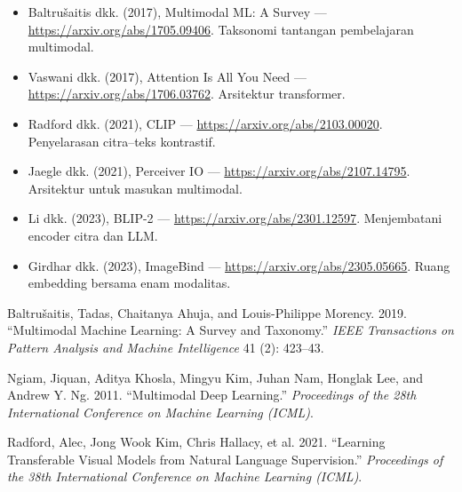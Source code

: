 \begin{bacaan}

\begin{itemize}
\tightlist
\item
  Baltrušaitis dkk. (2017), Multimodal ML: A Survey --- \url{https://arxiv.org/abs/1705.09406}. Taksonomi tantangan pembelajaran multimodal.
\item
  Vaswani dkk. (2017), Attention Is All You Need --- \url{https://arxiv.org/abs/1706.03762}. Arsitektur transformer.
\item
  Radford dkk. (2021), CLIP --- \url{https://arxiv.org/abs/2103.00020}. Penyelarasan citra--teks kontrastif.
\item
  Jaegle dkk. (2021), Perceiver IO --- \url{https://arxiv.org/abs/2107.14795}. Arsitektur untuk masukan multimodal.
\item
  Li dkk. (2023), BLIP-2 --- \url{https://arxiv.org/abs/2301.12597}. Menjembatani encoder citra dan LLM.
\item
  Girdhar dkk. (2023), ImageBind --- \url{https://arxiv.org/abs/2305.05665}. Ruang embedding bersama enam modalitas.
\end{itemize}

\end{bacaan}

\rujukanheading

\protect{}\label{refs}
\begin{CSLReferences}{1}{1}
Baltrušaitis, Tadas, Chaitanya Ahuja, and Louis-Philippe Morency. 2019. {``Multimodal Machine Learning: A Survey and Taxonomy.''} \emph{IEEE Transactions on Pattern Analysis and Machine Intelligence} 41 (2): 423--43.

Ngiam, Jiquan, Aditya Khosla, Mingyu Kim, Juhan Nam, Honglak Lee, and Andrew Y. Ng. 2011. {``Multimodal Deep Learning.''} \emph{Proceedings of the 28th International Conference on Machine Learning (ICML)}.

Radford, Alec, Jong Wook Kim, Chris Hallacy, et al. 2021. {``Learning Transferable Visual Models from Natural Language Supervision.''} \emph{Proceedings of the 38th International Conference on Machine Learning (ICML)}.

\end{CSLReferences}
